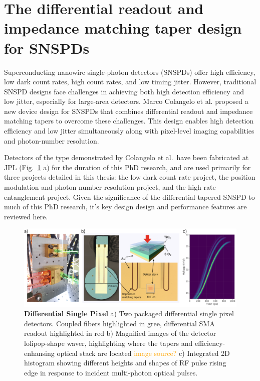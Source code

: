\documentclass[11pt]{caltech_thesis} %
\begin{document}
\hypertarget{the-differential-readout-and-impedance-matching-taper-design-for-snspds}{%
\section{The differential readout and impedance matching taper design for SNSPDs}\label{the-differential-readout-and-impedance-matching-taper-design-for-snspds}}

Superconducting nanowire single-photon detectors (SNSPDs) offer high efficiency, low dark count rates, high count rates, and low timing jitter. However, traditional SNSPD designs face challenges in achieving both high detection efficiency and low jitter, especially for large-area detectors. Marco Colangelo et al. \autocite{Colangelo2023} proposed a new device design for SNSPDs that combines differential readout and impedance matching tapers to overcome these challenges. This design enables high detection efficiency and low jitter simultaneously along with pixel-level imaging capabilities and photon-number resolution.

Detectors of the type demonstrated by Colangelo et al.~have been fabricated at JPL (Fig.~\ref{fig:diff} a) for the duration of this PhD research, and are used primarily for three projects detailed in this thesis: the low dark count rate project, the position modulation and photon number resolution project, and the high rate entanglement project. Given the significance of the differential tapered SNSPD to much of this PhD research, it's key design design and performance features are reviewed here.

\hypertarget{fig:diff}{%
\begin{figure}
\centering
\includegraphics{./chapter_01/figs/diff_light.png}
\caption[{Differential Single Pixel}]{\textbf{Differential Single Pixel} a) Two packaged differential single pixel detectors. Coupled fibers highlighted in gree, differential SMA readout highlighted in red b) Magnified images of the detector lolipop-shape waver, highlighting where the tapers and efficiency-enhansing optical stack are located \textcolor{orange}{image source?} c) Integrated 2D histogram showing different heights and shapes of RF pulse rising edge in response to incident multi-photon optical pulses.}
\label{fig:diff}
\end{figure}
}
\end{document}
